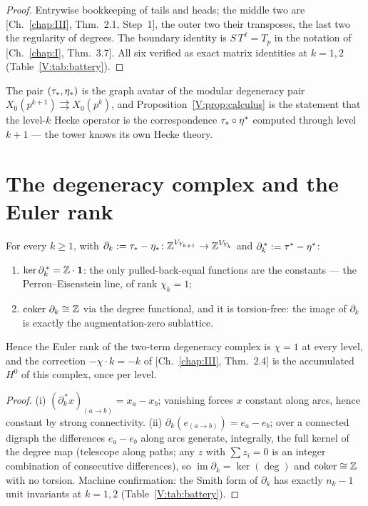 \begin{proof}
Entrywise bookkeeping of tails and heads; the middle two are [Ch.~\ref{chap:III}, Thm.~2.1, Step~1],
the outer two their transposes, the last two the regularity of degrees. The boundary
identity is $S\,T^{\,t}=T_p$ in the notation of [Ch.~\ref{chap:I}, Thm.~3.7]. All six verified as
exact matrix identities at $k=1,2$ (Table~\ref{V:tab:battery}).
\end{proof}

The pair $(\tau_*,\eta_*)$ is the graph avatar of the modular degeneracy pair
$X_0(p^{k+1})\rightrightarrows X_0(p^k)$, and Proposition~\ref{V:prop:calculus} is the
statement that the level-$k$ Hecke operator is the correspondence
$\tau_*\circ\eta^*$ computed through level $k{+}1$ --- the tower knows its own Hecke
theory.

\section{The degeneracy complex and the Euler rank}\label{V:sec:euler}

\begin{theorem}\label{V:thm:euler}
For every $k\ge1$, with $\partial_k:=\tau_*-\eta_*\colon\mathbb{Z}^{V_{Y_{k+1}}}\to\mathbb{Z}^{V_{Y_k}}$ and
$\partial_k^{\,*}:=\tau^*-\eta^*$:
\begin{enumerate}
\item[(i)] $\ker\partial_k^{\,*}=\mathbb{Z}\cdot\mathbf1$: the only pulled-back-equal
functions are the constants --- the Perron--Eisenstein line, of rank $\chi_k=1$;
\item[(ii)] $\operatorname{coker}\,\partial_k\cong\mathbb{Z}$ via the degree functional, and it is
torsion-free: the image of $\partial_k$ is exactly the augmentation-zero sublattice.
\end{enumerate}
Hence the Euler rank of the two-term degeneracy complex is $\chi=1$ at every level,
and the correction $-\chi\cdot k=-k$ of {\rm[Ch.~\ref{chap:III}, Thm.~2.4]} is the accumulated
$H^0$ of this complex, once per level.
\end{theorem}

\begin{proof}
(i) $(\partial_k^{\,*}x)_{(a\to b)}=x_a-x_b$; vanishing forces $x$ constant along
arcs, hence constant by strong connectivity. (ii) $\partial_k(e_{(a\to b)})
=e_a-e_b$; over a connected digraph the differences $e_a-e_b$ along arcs generate,
integrally, the full kernel of the degree map (telescope along paths; any
$z$ with $\sum z_i=0$ is an integer combination of consecutive differences), so
$\operatorname{im}\partial_k=\ker(\deg)$ and $\operatorname{coker}\cong\mathbb{Z}$ with no torsion.
Machine confirmation: the Smith form of $\partial_k$ has exactly $n_k-1$ unit
invariants at $k=1,2$ (Table~\ref{V:tab:battery}).
\end{proof}

